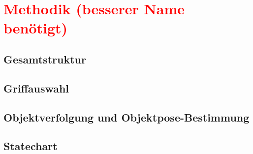 \chapter{\textcolor{red}{Methodik (besserer Name benötigt)}}

\section{Gesamtstruktur}

\section{Griffauswahl}

\section{Objektverfolgung und Objektpose-Bestimmung}

\section{Statechart}